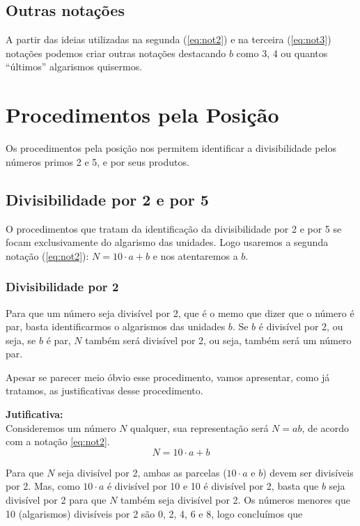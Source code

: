 \documentclass[12pt,a4paper]{article}
\begin{document}
		\subsection*{Outras notações}
		
		A partir das ideias utilizadas na segunda (\ref{eq:not2}) e na terceira (\ref{eq:not3}) notações podemos criar outras notações destacando $b$ como 3, 4 ou quantos ``últimos'' algarismos quisermos.
		
		\section{Procedimentos pela Posição}
		\label{sec:posicao}
		Os procedimentos pela posição nos permitem identificar a divisibilidade pelos números primos 2 e 5, e por seus produtos. 
		
		\subsection{Divisibilidade por 2 e por 5}
		\label{sub:2_5}
		O procedimentos que tratam da identificação da divisibilidade por 2 e por 5 se focam exclusivamente do algarismo das unidades. Logo usaremos a segunda notação (\ref{eq:not2}): $N = 10 \cdot a + b$ e nos atentaremos a $b$. 
		
		\subsubsection{Divisibilidade por 2}
		Para que um número seja divisível por 2, que é o memo que dizer que o número é par, basta identificarmos o algarismos das unidades $b$. Se $b$ é divisível por 2, ou seja, se $b$ é par, $N$ também será divisível por 2, ou seja, também será um número par.
		
		Apesar se parecer meio óbvio esse procedimento, vamos apresentar, como já tratamos, as justificativas desse procedimento.
		
		\textbf{Jutificativa:}\\
		Consideremos um número $N$ qualquer, sua representação será $N = ab$, de acordo com a notação \ref{eq:not2}.		
		$$N = 10 \cdot a + b$$
				
		Para que $N$ seja divisível por 2, ambas as parcelas ($10 \cdot a$ e $b$) devem ser divisíveis por 2. Mas, como $10 \cdot a$ é divisível por 10 e 10 é divisível por 2, basta que $b$ seja divisível por 2 para que $N$ também seja divisível por 2. Os números menores que 10 (algarismos) divisíveis por 2 são 0, 2, 4, 6 e 8, logo concluímos que
		
\end{document}
